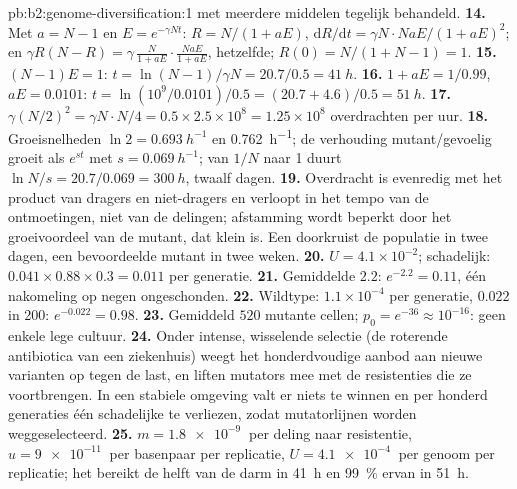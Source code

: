 \begin{solution}{pb:b2:genome-diversification:1}
met meerdere middelen tegelijk behandeld.
\textbf{14.} Met $a = N - 1$ en $E = e^{-\gamma Nt}$: $R = N/(1 +
aE)$, $\mathrm{d}R/\mathrm{d}t = \gamma N\cdot NaE/(1 + aE)^2$; en
$\gamma R(N - R) = \gamma\,\frac{N}{1 + aE}\cdot\frac{NaE}{1 + aE}$,
hetzelfde; $R(0) = N/(1 + N - 1) = 1$.
\textbf{15.} $(N - 1)E = 1$: $t = \ln(N - 1)/\gamma N = 20.7/0.5 =
\qty{41}{h}$.
\textbf{16.} $1 + aE = 1/0.99$, $aE = 0.0101$: $t = \ln(10^{9}/0.0101)
/0.5 = (20.7 + 4.6)/0.5 = \qty{51}{h}$.
\textbf{17.} $\gamma (N/2)^2 = \gamma N\cdot N/4 = 0.5\times 2.5\times
10^{8} = 1.25\times 10^{8}$ overdrachten per uur.
\textbf{18.} Groeisnelheden $\ln 2 = \qty{0.693}{h^{-1}}$ en
\qty{0.762}{h^{-1}}; de verhouding mutant/gevoelig groeit als $e^{st}$
met $s = \qty{0.069}{h^{-1}}$; van $1/N$ naar 1 duurt $\ln N/s =
20.7/0.069 = \qty{300}{h}$, twaalf dagen.
\textbf{19.} Overdracht is evenredig met het product van dragers en
niet-dragers en verloopt in het tempo van de ontmoetingen, niet van de
delingen; afstamming wordt beperkt door het groeivoordeel van de mutant,
dat klein is. Een  doorkruist de populatie in twee dagen, een
bevoordeelde mutant in twee weken.
\textbf{20.} $U = 4.1\times 10^{-2}$; schadelijk: $0.041\times 0.88\times
0.3 = 0.011$ per generatie.
\textbf{21.} Gemiddelde $2.2$: $e^{-2.2} = 0.11$, één nakomeling op negen
ongeschonden.
\textbf{22.} Wildtype: $1.1\times 10^{-4}$ per generatie, $0.022$ in
200: $e^{-0.022} = 0.98$.
\textbf{23.} Gemiddeld $520$ mutante cellen; $p_0 = e^{-36} \approx
10^{-16}$: geen enkele lege cultuur.
\textbf{24.} Onder intense, wisselende selectie (de roterende antibiotica
van een ziekenhuis) weegt het honderdvoudige aanbod aan nieuwe varianten
op tegen de last, en liften mutators mee met de resistenties die ze
voortbrengen. In een stabiele omgeving valt er niets te winnen en per
honderd generaties één schadelijke  te verliezen, zodat
mutatorlijnen worden weggeselecteerd.
\textbf{25.} $m = \qty{1.8e-9}{}$ per deling naar resistentie, $u =
\qty{9e-11}{}$ per basenpaar per replicatie, $U = \qty{4.1e-4}{}$
 per genoom per replicatie; het  bereikt de helft van de
darm in \qty{41}{h} en \qty{99}{\%} ervan in \qty{51}{h}.
\end{solution}
